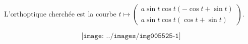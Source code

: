 {\begin{enumerate}
{L'orthoptique cherchée est la courbe $t\mapsto\left(
\begin{array}{c}
a\sin t\cos t(-\cos t+\sin t)\\
a\sin t\cos t(\cos t+\sin t)
\end{array}
\right)$.

$$\texttt{[image: ../images/img005525-1]}$$
}
\end{enumerate}
}
